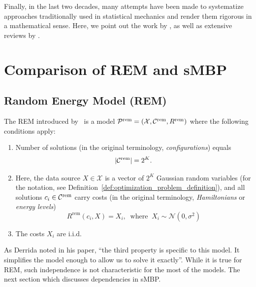 Finally, in the last two decades, many attempts have been made to systematize
approaches traditionally used in statistical mechanics and render them rigorous
in a mathematical sense. Here, we point out the work by
\citet{Bovier2002FreeEnergyFluct}, as well as extensive
reviews by \citet{talagrand03,bovier2012statistical}.

\section{Comparison of REM and sMBP}

\subsection{Random Energy Model (REM)}


The REM introduced by~\citet{derrida81} is a model $\mathcal{P}^\mathrm{rem} =
(\mathcal{X}, {\cal C}^\mathrm{rem}, R^\mathrm{rem})$ 
%
where the following conditions apply:
\begin{enumerate}
  \item Number of solutions (in the original terminology,
    \textit{configurations}) equals 
    \begin{equation}
      |{\cal C}^\mathrm{rem}| = 2^K.
    \end{equation}
  \item Here, the data source $X \in \mathcal{X}$ is a vector of $2^K$ Gaussian
    random variables (for the notation, see
    Definition~\ref{def:optimization_problem_definition}), and all solutions
    $c_i
    \in {\cal C}^\mathrm{rem}$ carry costs (in the original terminology,
    \textit{Hamiltonians} or \textit{energy levels})
    \begin{equation}
      R^\mathrm{rem}(c_i, X) = X_i, \;\; \text{where} \;\; X_i \sim \mathcal{N}(0, \sigma^2)
    \end{equation}
    \item The costs $X_i$ are i.i.d.
\end{enumerate}

As Derrida noted in his paper, ``the third property is specific to this model.
It simplifies the model enough to allow us to solve it exactly''. While it is
true for REM, such independence is not characteristic for the most of the
models. The next section which discusses dependencies in sMBP.

